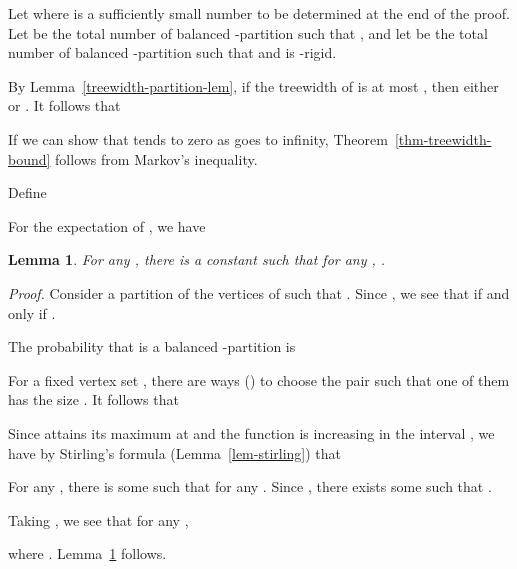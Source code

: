 \documentclass[11pt]{article}
\newtheorem{lemma}{Lemma}[section]
\providecommand{\qed}{\hfill }
\newenvironment{proof}[0]{\textit{Proof.} }{\hfill  \qed}
\begin{document}
Let  where  is a sufficiently small number to be determined
at the end of the proof.  Let  be the total number of balanced -partition
 such that , and  
let  be the total number of balanced -partition
 such that  and  is -rigid.    

By Lemma~\ref{treewidth-partition-lem}, if the treewidth of  is at most , then 
either  or . It follows that
 
If we can show that  tends to zero  as  goes to infinity, 
Theorem~\ref{thm-treewidth-bound} follows from Markov's inequality. 

Define

For the expectation of , we have   
\begin{lemma}
\label{lem-j-1} 
For any , there is a constant  such that for any ,  
.
\end{lemma}   
\begin{proof}
Consider a partition  of
the vertices of  such that . Since
, we see that 
 if and only if 
. 

The probability that  is a balanced -partition is
 
For a fixed vertex set , there are  ways
() to choose the pair  such that
one of them has the size . It follows that

Since  attains its maximum at  and the function 
 is increasing in the interval , we have
by Stirling's formula (Lemma~\ref{lem-stirling}) that
            
For any , there is some  such that 
for any . Since 
, there
exists some  such that 
.

Taking , we see that for any ,  

where . Lemma~\ref{lem-j-1} follows. 
\end{proof}   
   
\end{document}
